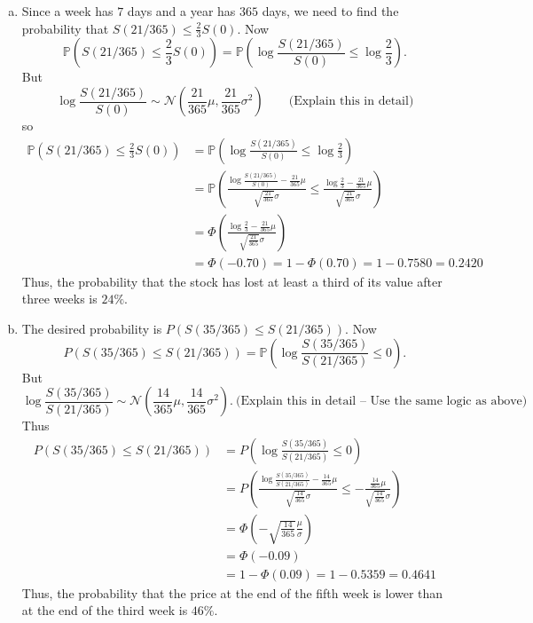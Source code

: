 \documentclass[11pt,a4paper]{report}
\begin{document}
    \begin{enumerate}[(a)]
        \item Since a week has $7$ days and a year has $365$ days, we need to find the probability that $S(21/365) \leq \frac{2}{3}S(0)$. Now
        $$\mathbb{P}\left(S(21/365) \leq \frac{2}{3}S(0)\right) = \mathbb{P}\left(\log\frac{S(21/365)}{S(0)}\leq \log\frac{2}{3}\right).$$
        But
        $$\log\frac{S(21/365)}{S(0)}\sim \mathcal{N}\left(\frac{21}{365}\mu,\frac{21}{365}\sigma^2\right) \quad \quad \text{(Explain this in detail)}$$
        so
        \begin{align*}
            \mathbb{P}\left(S(21/365)\leq \frac{2}{3}S(0)\right) &= \mathbb{P}\left(\log\frac{S(21/365)}{S(0)}\leq \log\frac{2}{3}\right)\\
            &= \mathbb{P}\left(\frac{\log \frac{S(21/365)}{S(0)}-\frac{21}{365}\mu}{\sqrt{\frac{21}{365}}\sigma}\leq \frac{\log\frac{2}{3}-\frac{21}{365}\mu}{\sqrt{\frac{21}{365}}\sigma}\right)\\
            &= \Phi \left(\frac{\log\frac{2}{3}-\frac{21}{365}\mu}{\sqrt{\frac{21}{365}}\sigma}\right)\\
            &= \Phi(-0.70) = 1-\Phi(0.70) = 1- 0.7580 = 0.2420
        \end{align*}
        Thus, the probability that the stock has lost at least a third of its value after three weeks is $24\%$.
        \item The desired probability is $P(S(35/365) \leq S(21/365))$. Now
        $$P(S(35/365) \leq S(21/365)) = \mathbb{P}\left(\log \frac{S(35/365)}{S(21/365)}\leq 0\right).$$
        But
        $$\log \frac{S(35/365)}{S(21/365)}\sim \mathcal{N}\left(\frac{14}{365}\mu,\frac{14}{365}\sigma^2\right).\ \text{(Explain this in detail – Use the same logic as above)}$$
        Thus
        \begin{align*}
            P(S(35/365) \leq S(21/365)) &= P\left(\log\frac{S(35/365)}{S(21/365)}\leq 0\right)\\
            &= P\left(\frac{\log\frac{S(35/365)}{S(21/365)}-\frac{14}{365}\mu}{\sqrt{\frac{14}{365}}\sigma}\leq -\frac{\frac{14}{365}\mu}{\sqrt{\frac{14}{365}}\sigma}\right)\\
            &= \Phi\left(-\sqrt{\frac{14}{365}}\frac{\mu}{\sigma}\right)\\
            &= \Phi(-0.09)\\
            &= 1 - \Phi(0.09) = 1- 0.5359 = 0.4641
        \end{align*}
        Thus, the probability that the price at the end of the fifth week is lower than at the end of the third week is $46\%$.
    \end{enumerate}
\end{document}
